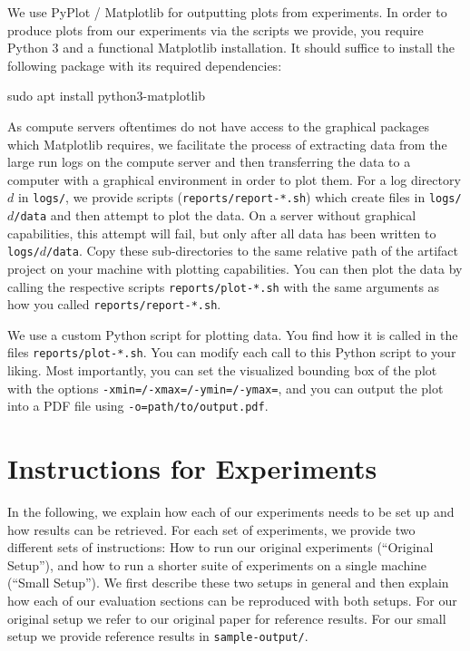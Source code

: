 \documentclass[runningheads]{article}
\numberwithin{dummy}{subsection}
\begin{document}
We use PyPlot / Matplotlib for outputting plots from experiments.
In order to produce plots from our experiments via the scripts we provide, you require Python 3 and a functional Matplotlib installation.
It should suffice to install the following package with its required dependencies:

\begin{ttfenv}
sudo apt install python3-matplotlib
\end{ttfenv}

As compute servers oftentimes do not have access to the graphical packages which Matplotlib requires, we facilitate the process of extracting data from the large run logs on the compute server and then transferring the data to a computer with a graphical environment in order to plot them.
For a log directory $d$ in \texttt{logs/}, we provide scripts (\texttt{reports/report-*.sh}) which create files in \texttt{logs/$d$/data} and then attempt to plot the data.
On a server without graphical capabilities, this attempt will fail, but only after all data has been written to \texttt{logs/$d$/data}.
Copy these sub-directories to the same relative path of the artifact project on your machine with plotting capabilities.
You can then plot the data by calling the respective scripts \texttt{reports/plot-*.sh} with the same arguments as how you called \texttt{reports/report-*.sh}.

We use a custom Python script for plotting data.
You find how it is called in the files \texttt{reports/plot-*.sh}.
You can modify each call to this Python script to your liking.
Most importantly, you can set the visualized bounding box of the plot with the options \texttt{-xmin=/-xmax=/-ymin=/-ymax=}, and you can output the plot into a PDF file using \texttt{-o=path/to/output.pdf}.














\section{Instructions for Experiments}

In the following, we explain how each of our experiments needs to be set up and how results can be retrieved.
For each set of experiments, we provide two different sets of instructions: How to run our original experiments (``Original Setup''), and how to run a shorter suite of experiments on a single machine (``Small Setup'').
We first describe these two setups in general and then explain how each of our evaluation sections can be reproduced with both setups.
For our original setup we refer to our original paper for reference results.
For our small setup we provide reference results in \texttt{sample-output/}.
\end{document}
